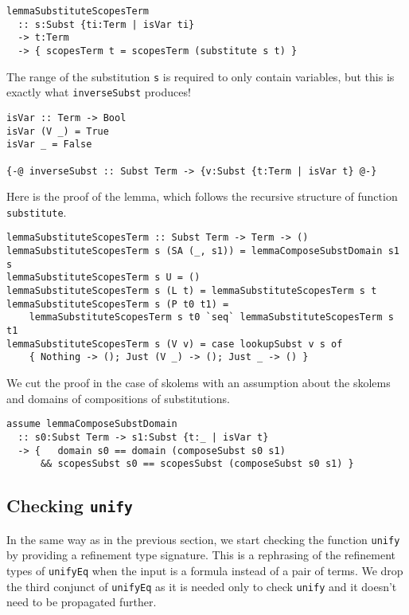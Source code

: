 \documentclass[acmtog, anonymous]{acmart}
\newcommand{\tc}[1]{{\small\texttt{#1}}}
\begin{document}
\begin{verbatim}
lemmaSubstituteScopesTerm
  :: s:Subst {ti:Term | isVar ti}
  -> t:Term
  -> { scopesTerm t = scopesTerm (substitute s t) }
\end{verbatim}

The range of the substitution \tc{s} is required to only contain variables, but
this is exactly what \tc{inverseSubst} produces!

\begin{verbatim}
isVar :: Term -> Bool
isVar (V _) = True
isVar _ = False

{-@ inverseSubst :: Subst Term -> {v:Subst {t:Term | isVar t} @-}
\end{verbatim}

Here is the proof of the lemma, which follows the recursive structure
of function \tc{substitute}.

\begin{verbatim}
lemmaSubstituteScopesTerm :: Subst Term -> Term -> ()
lemmaSubstituteScopesTerm s (SA (_, s1)) = lemmaComposeSubstDomain s1 s
lemmaSubstituteScopesTerm s U = ()
lemmaSubstituteScopesTerm s (L t) = lemmaSubstituteScopesTerm s t
lemmaSubstituteScopesTerm s (P t0 t1) =
    lemmaSubstituteScopesTerm s t0 `seq` lemmaSubstituteScopesTerm s t1
lemmaSubstituteScopesTerm s (V v) = case lookupSubst v s of
    { Nothing -> (); Just (V _) -> (); Just _ -> () }
\end{verbatim}

We cut the proof in the case of skolems with an assumption about the
skolems and domains of compositions of substitutions.

\begin{verbatim}
assume lemmaComposeSubstDomain
  :: s0:Subst Term -> s1:Subst {t:_ | isVar t}
  -> {   domain s0 == domain (composeSubst s0 s1)
      && scopesSubst s0 == scopesSubst (composeSubst s0 s1) }
\end{verbatim}


\subsection{Checking \tc{unify}}

In the same way as in the previous section, we start checking the function \tc{unify}
by providing a refinement type signature. This is a rephrasing of the refinement
types of \tc{unifyEq} when the input is a formula instead of a pair of terms. We
drop the third conjunct of \tc{unifyEq} as it is needed only to check \tc{unify} and
it doesn't need to be propagated further.
\end{document}
